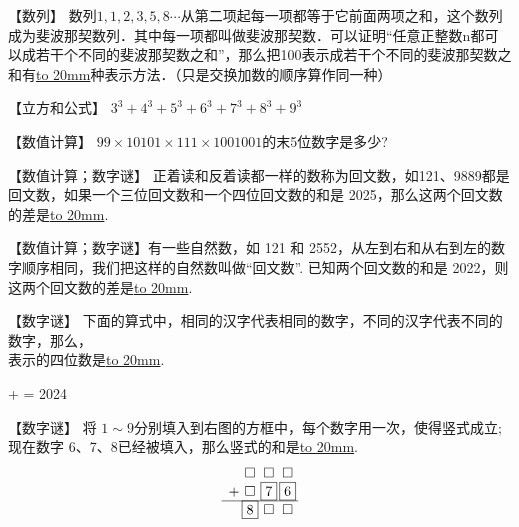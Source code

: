 \item {
    【数列】
    数列$1, 1,2,3,5,8\cdots$从第二项起每一项都等于它前面两项之和，这个数列成为斐波那契数列．其中每一项都叫做斐波那契数．可以证明“任意正整数n都可以成若干个不同的斐波那契数之和”，那么把100表示成若干个不同的斐波那契数之和有\underline{\hbox to 20mm{}}种表示方法．（只是交换加数的顺序算作同一种）  
    \vspace{1cm}
}

\item {
    【立方和公式】
    $3^3 + 4^3 + 5^3 + 6^3 + 7^3 + 8^3 + 9^3$
    \vspace{1cm}
}

\item {
    【数值计算】
    $99\times 10101\times 111\times 1001001$的末5位数字是多少?
    \vspace{1cm}
}

\item {
    【数值计算；数字谜】
    正着读和反着读都一样的数称为回文数，如121、9889都是回文数，如果一个三位回文数和一个四位回文数的和是 2025，那么这两个回文数的差是\underline{\hbox to 20mm{}}.
    \vspace{1cm}
}

\item {
    【数值计算；数字谜】有一些自然数，如 121 和 2552，从左到右和从右到左的数字顺序相同，我们把这样的自然数叫做``回文数''. 已知两个回文数的和是 2022，则这两个回文数的差是\underline{\hbox to 20mm{}}.
    \vspace{1cm}
}

\item {
    【数字谜】
    下面的算式中，相同的汉字代表相同的数字，不同的汉字代表不同的数字，那么，\\ 表示的四位数是\underline{\hbox to 20mm{}}. \\
    \begin{center}
         +  = 2024
    \end{center}
    \vspace{1cm}
}

\item {
    【数字谜】
    将 $1\sim 9$分别填入到右图的方框中，每个数字用一次，使得竖式成立;现在数字 6、7、8已经被填入，那么竖式的和是\underline{\hbox to 20mm{}}.
    \[
    \begin{array}{l@{\,} c@{\,} c@{\,} c@{\,}}
    & \square & \square & \square \\
    + & \square  & \boxed{7} & \boxed{6} \\
    \cline{1-4}
    & \boxed{8} & \square & \square \\
    \end{array}
    \]
    \vspace{1cm}
}

